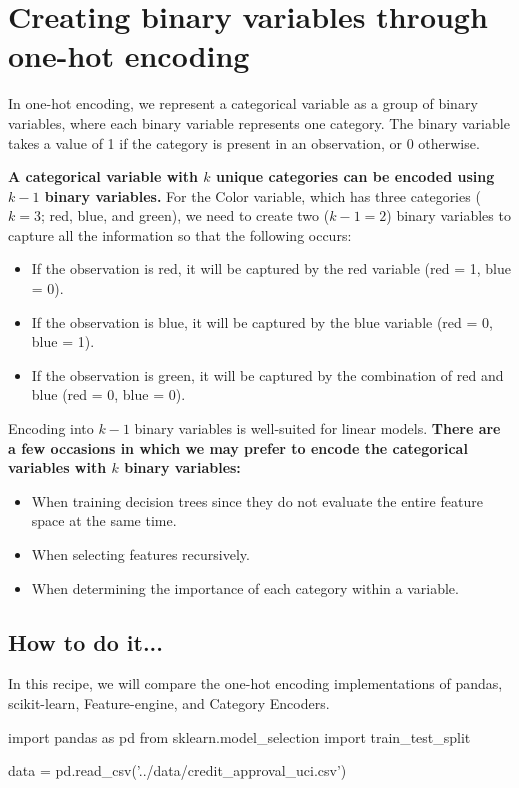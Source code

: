 \section{Creating binary variables through one-hot encoding}
In one-hot encoding, we represent a categorical variable as a group of binary variables, where each binary variable represents one category. The binary variable takes a value of 1 if the category is present in an observation, or 0 otherwise.

\textbf{A categorical variable with $k$ unique categories can be encoded using $k-1$ binary variables.} For the Color variable, which has three categories ($k=3$; red, 
blue, and green), we need to create two ($k - 1 = 2$) binary variables to capture all the information so that the following occurs:
\begin{itemize}
    \item If the observation is red, it will be captured by the red variable (red = 1, blue = 0).
    \item If the observation is blue, it will be captured by the blue variable (red = 0, blue = 1).
    \item If the observation is green, it will be captured by the combination of red and blue (red = 0, 
    blue = 0).    
\end{itemize}

Encoding into $k-1$ binary variables is well-suited for linear models. \textbf{There are a few occasions in which we may prefer to encode the categorical variables with $k$ binary variables:}

\begin{itemize}
    \item When training decision trees since they do not evaluate the entire feature space at the same time.
    \item When selecting features recursively.
    \item When determining the importance of each category within a variable.
\end{itemize}
\subsection{How to do it...}
In this recipe, we will compare the one-hot encoding implementations of pandas, scikit-learn, Feature-engine, and Category Encoders.

\begin{pyc}
import pandas as pd
from sklearn.model_selection import train_test_split

data = pd.read_csv('../data/credit_approval_uci.csv')
\end{pyc}


